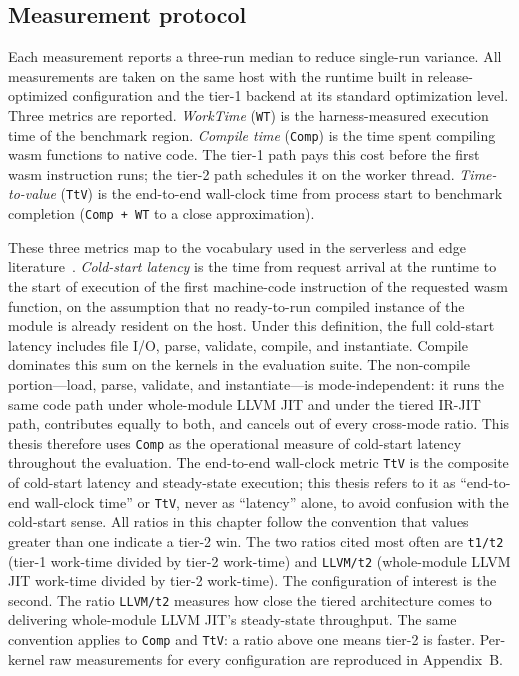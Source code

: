 \subsection{Measurement protocol}
\label{sec:eval:method:protocol}

Each measurement reports a three-run median to reduce single-run variance. All measurements are taken on the same host with the runtime built in release-optimized configuration and the tier-1 backend at its standard optimization level. Three metrics are reported. \emph{WorkTime} (\texttt{WT}) is the harness-measured execution time of the benchmark region. \emph{Compile time} (\texttt{Comp}) is the time spent compiling wasm functions to native code. The tier-1 path pays this cost before the first wasm instruction runs; the tier-2 path schedules it on the worker thread. \emph{Time-to-value} (\texttt{TtV}) is the end-to-end wall-clock time from process start to benchmark completion (\texttt{Comp + WT} to a close approximation).

These three metrics map to the vocabulary used in the serverless and edge literature~\cite{gackstatter2022serverless,shahrad2020serverless}. \emph{Cold-start latency} is the time from request arrival at the runtime to the start of execution of the first machine-code instruction of the requested wasm function, on the assumption that no ready-to-run compiled instance of the module is already resident on the host. Under this definition, the full cold-start latency includes file I/O, parse, validate, compile, and instantiate. Compile dominates this sum on the kernels in the evaluation suite. The non-compile portion---load, parse, validate, and instantiate---is mode-independent: it runs the same code path under whole-module LLVM JIT and under the tiered IR-JIT path, contributes equally to both, and cancels out of every cross-mode ratio. This thesis therefore uses \texttt{Comp} as the operational measure of cold-start latency throughout the evaluation. The end-to-end wall-clock metric \texttt{TtV} is the composite of cold-start latency and steady-state execution; this thesis refers to it as ``end-to-end wall-clock time'' or \texttt{TtV}, never as ``latency'' alone, to avoid confusion with the cold-start sense.
All ratios in this chapter follow the convention that values greater than one indicate a tier-2 win. The two ratios cited most often are \texttt{t1/t2} (tier-1 work-time divided by tier-2 work-time) and \texttt{LLVM/t2} (whole-module LLVM JIT work-time divided by tier-2 work-time). The configuration of interest is the second. The ratio \texttt{LLVM/t2} measures how close the tiered architecture comes to delivering whole-module LLVM JIT's steady-state throughput. The same convention applies to \texttt{Comp} and \texttt{TtV}: a ratio above one means tier-2 is faster. Per-kernel raw measurements for every configuration are reproduced in Appendix~B.

